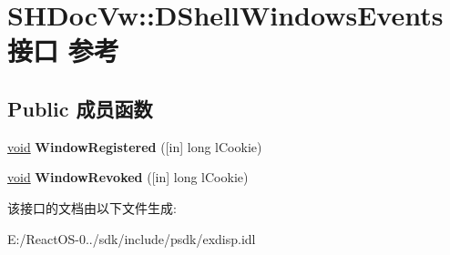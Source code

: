 \hypertarget{interface_s_h_doc_vw_1_1_d_shell_windows_events}{}\section{S\+H\+Doc\+Vw\+:\+:D\+Shell\+Windows\+Events接口 参考}
\label{interface_s_h_doc_vw_1_1_d_shell_windows_events}
\subsection*{Public 成员函数}
\begin{DoxyCompactItemize}
\item 
\mbox{\label{interface_s_h_doc_vw_1_1_d_shell_windows_events_a6297e40bd618d76863297f05a9da4e40}} 
\hyperlink{interfacevoid}{void} {\bfseries Window\+Registered} (\mbox{[}in\mbox{]} long l\+Cookie)
\item 
\mbox{\label{interface_s_h_doc_vw_1_1_d_shell_windows_events_af49de5d4ebd2a13027561d26cd810e92}} 
\hyperlink{interfacevoid}{void} {\bfseries Window\+Revoked} (\mbox{[}in\mbox{]} long l\+Cookie)
\end{DoxyCompactItemize}


该接口的文档由以下文件生成\+:\begin{DoxyCompactItemize}
\item 
E\+:/\+React\+O\+S-\/0../sdk/include/psdk/exdisp.\+idl\end{DoxyCompactItemize}
